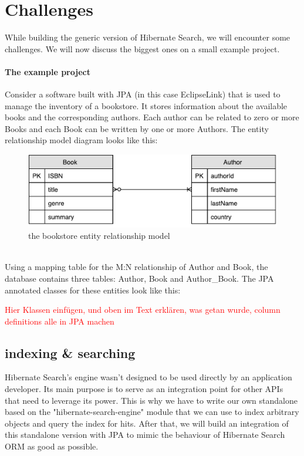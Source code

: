 \section{Challenges}\label{Challenges}
While building the generic version of Hibernate Search, we will encounter some challenges. We will now discuss the biggest ones on a small example project.

\paragraph{The example project}
Consider a software built with JPA (in this case EclipseLink) that is used to manage the inventory of a bookstore. It stores information about the available books and the corresponding authors. Each author can be related to zero or more Books and each Book can be written by one or more Authors. The entity relationship model diagram looks like this:
\\
\begin{figure}[ht]
	\centering
	\includegraphics[scale = 0.9]{images/Sample_Project_ER.pdf}
	\caption{the bookstore entity relationship model}
	\label{fig3}
\end{figure}
\\
Using a mapping table for the M:N relationship of Author and Book, the database contains three tables: Author, Book and Author\_Book. The JPA annotated classes for these entities look like this:

\textcolor{red}{Hier Klassen einfügen, und oben im Text erklären, was getan wurde, column definitions alle in JPA machen}

\subsection{indexing \& searching}
Hibernate Search's engine wasn't designed to be used directly by an application developer. Its main purpose is to serve as an integration point for other APIs that need to leverage its power. This is why we have to write our own standalone based on the "hibernate-search-engine" module that we can use to index arbitrary objects and query the index for hits. After that, we will build an integration of this standalone version with JPA to mimic the behaviour of Hibernate Search ORM as good as possible.

